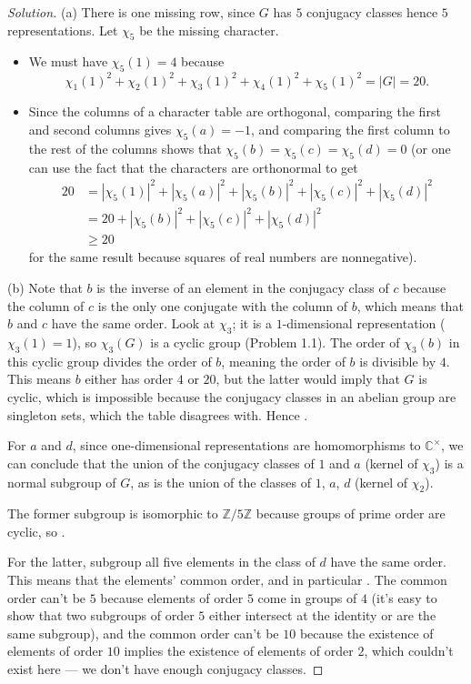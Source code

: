 \documentclass[10pt]{scrartcl}
\providecommand{\CC}{\mathbb C}
\providecommand{\ZZ}{\mathbb Z}
\providecommand{\ii}{\item}
\newenvironment{soln}{\begin{proof}[Solution]}{\end{proof}}
\begin{document}
\begin{soln}
	(a) There is one missing row, since $G$ has $5$ conjugacy classes
	hence $5$ representations. Let $\chi_5$ be the missing character.
	\begin{itemize}
		\ii We must have $\chi_5(1) = 4$ because
		\[\chi_1(1)^2 + \chi_2(1)^2 + \chi_3(1)^2 + \chi_4(1)^2 + \chi_5(1)^2
		= |G| = 20.\]
		\ii Since the columns of a character table are orthogonal,
		comparing the first and second columns gives $\chi_5(a) = -1$,
		and comparing the first column to the rest of the columns shows that
		$\chi_5(b) = \chi_5(c) = \chi_5(d) = 0$
		(or one can use the fact that the characters are orthonormal to get
		\begin{align*}
			20 &= |\chi_5(1)|^2 + |\chi_5(a)|^2 + |\chi_5(b)|^2 +
			|\chi_5(c)|^2 + |\chi_5(d)|^2\\
			&= 20 + |\chi_5(b)|^2 + |\chi_5(c)|^2 + |\chi_5(d)|^2\\
			&\ge 20
		\end{align*}
		for the same result because squares of real numbers are nonnegative).
	\end{itemize}
	
	(b) Note that $b$ is the inverse of an element in the conjugacy class of $c$
	because the column of $c$ is the only one conjugate with the column of $b$,
	which means that $b$ and $c$ have the same order.
	Look at $\chi_3$; it is a $1$-dimensional representation
	($\chi_3(1) = 1$), so $\chi_3(G)$ is a cyclic group (Problem 1.1).
	The order of $\chi_3(b)$ in this cyclic group
	divides the order of $b$, meaning the order of $b$ is divisible by $4$.
	This means $b$ either has order $4$ or $20$,
	but the latter would imply that $G$ is cyclic, which is impossible
	because the conjugacy classes in an abelian group are singleton sets,
	which the table disagrees with. Hence .
	
	For $a$ and $d$, since one-dimensional representations are homomorphisms
	to $\CC^\times$, we can conclude that the union of
	the conjugacy classes of $1$ and $a$ (kernel of $\chi_3$)
	is a normal subgroup of $G$, as is the union of
	the classes of $1$, $a$, $d$ (kernel of $\chi_2$).
	
	The former subgroup is isomorphic to $\ZZ/5\ZZ$ because
	groups of prime order are cyclic, so .
	
	For the latter, subgroup all five elements in the class of $d$
	have the same order.
	This means that the elements' common order,
	and in particular .
	The common order can't be $5$ because elements of order $5$
	come in groups of $4$ (it's easy to show that two subgroups of order $5$
	either intersect at the identity or are the same subgroup),
	and the common order can't be $10$ because the existence of
	elements of order $10$ implies the existence of elements of order $2$,
	which couldn't exist here --- we don't have enough conjugacy classes.
	

\end{soln}
\end{document}
